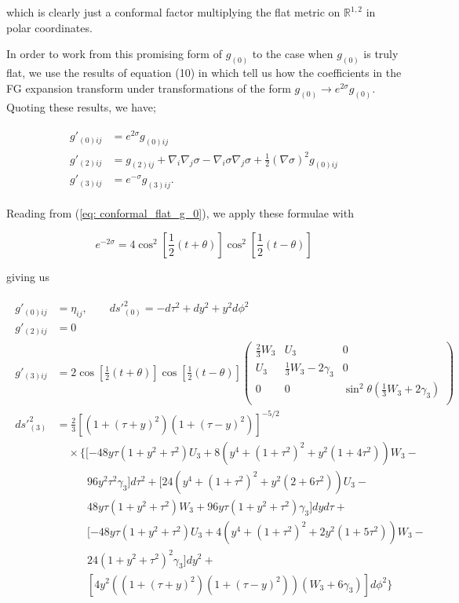 \documentclass[a4paper,11pt]{article}
\numberwithin{equation}{section}
\begin{document}
\noindent which is clearly just a conformal factor multiplying the flat metric on $\mathbb{R}^{1,2}$ in polar coordinates. \par

In order to work from this promising form of $g_{(0)}$ to the case when $g_{(0)}$ is truly flat, we use the results of equation (10) in \cite{Skenderis:2000in} which tell us how the coefficients in the FG expansion transform under transformations of the form $g_{(0)} \rightarrow e^{2\sigma} g_{(0)}$. Quoting these results, we have; 

\begin{align}
\begin{split}
g'_{(0)ij}&=e^{2\sigma}g_{(0)ij} \\
g'_{(2)ij}&=g_{(2)ij}+\nabla_{i}\nabla_{j} \sigma - \nabla_{i} \sigma \nabla_{j} \sigma + \frac{1}{2}(\nabla \sigma)^2 g_{(0)ij} \\
g'_{(3)ij}&=e^{-\sigma} g_{(3) ij}.
\end{split}
\end{align}

\noindent Reading from (\ref{eq: conformal_flat_g_0}), we apply these formulae with 

\begin{equation}
e^{-2\sigma}=4 \cos^2 \left[ \frac{1}{2}(t+ \theta) \right] \cos^2 \left[ \frac{1}{2}(t- \theta) \right]
\end{equation}

\noindent giving us 

\begin{align}
\begin{split} \label{eq: g_i_flat_g_0}
g'_{(0)ij}&=\eta_{ij}, \qquad  ds'^2_{(0)}=-d\tau^2+dy^2+y^2d\phi^2 \\
g'_{(2)ij}&=0 \\
g'_{(3)ij}&=2 \cos \left[ \frac{1}{2}(t+ \theta) \right] \cos \left[ \frac{1}{2}(t- \theta) \right] 
\left(
\begin{array}{ccc} 
\frac{2}{3} W_{3} & U_{3} & 0 \\
U_{3} & \frac{1}{3}W_{3} - 2\gamma_{3} & 0 \\
0 & 0 & \sin^2 \theta \left(\frac{1}{3}W_{3} +2 \gamma_{3}\right) \\
\end{array}
\right) \\
ds'^2_{(3)}&=\frac{2}{3}\left[(1+(\tau+y)^2)(1+(\tau-y)^2)\right]^{-5/2}\\
& \phantom{aa} \times \{ [-48 y \tau(1+y^2+\tau^2)U_3+8(y^4+(1+\tau^2)^2+y^2(1+4\tau^2))W_3-\\
&  \phantom{aaaaa\,}  96y^2\tau^2 \gamma_3] d\tau^2 +  [24(y^4+(1+\tau^2)^2+y^2(2+6\tau^2))U_3-\\
&  \phantom{aaaaa\,} 48y \tau(1+y^2+\tau^2)W_3+96y \tau (1+y^2+\tau^2)\gamma_3]dy d\tau+\\
& \phantom{aaaaa\,}  [-48y \tau(1+y^2+\tau^2)U_3+ 4(y^4+(1+\tau^2)^2+2y^2(1+5\tau^2))W_3-\\
& \phantom{aaaaa\,} 24(1+y^2+\tau^2)^2\gamma_3]dy^2+\\
& \phantom{aaaaa\,} [4y^2((1+(\tau+y)^2)(1+(\tau-y)^2))(W_3+6\gamma_3)]d\phi^2\}
\end{split}
\end{align}
\end{document}
